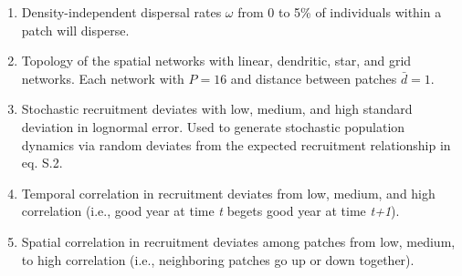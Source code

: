 \documentclass[
]{article}
\providecommand{\tightlist}{%
  \setlength{\itemsep}{0pt}\setlength{\parskip}{0pt}}
\begin{document}
\begin{enumerate}
\begin{enumerate}
\begin{enumerate}
      \begin{itemize}
      \tightlist
      \item
        total loss summed to a \textasciitilde90\% loss in abundance to
        the whole metapopulation, and
      \item
        left at least one local patch \emph{undisturbed} to start
        metapopulation recoveries.
      \end{itemize}
    \end{enumerate}
  \end{enumerate}
\item
  Density-independent dispersal rates \(\omega\) from 0 to 5\% of
  individuals within a patch will disperse.
\item
  Topology of the spatial networks with linear, dendritic, star, and
  grid networks. Each network with \(P=16\) and distance between patches
  \(\bar{d}=1\).
\item
  Stochastic recruitment deviates with low, medium, and high standard
  deviation in lognormal error. Used to generate stochastic population
  dynamics via random deviates from the expected recruitment
  relationship in eq. S.2.
\item
  Temporal correlation in recruitment deviates from low, medium, and
  high correlation (i.e., good year at time \emph{t} begets good year at
  time \emph{t+1}).
\item
  Spatial correlation in recruitment deviates among patches from low,
  medium, to high correlation (i.e., neighboring patches go up or down
  together).
\end{enumerate}
\end{document}
